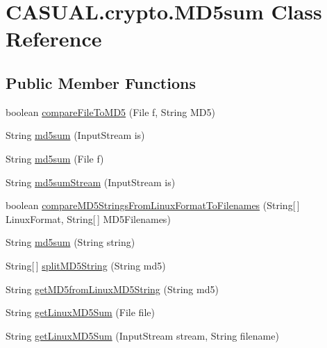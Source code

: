 \hypertarget{class_c_a_s_u_a_l_1_1crypto_1_1_m_d5sum}{\section{C\-A\-S\-U\-A\-L.\-crypto.\-M\-D5sum Class Reference}
\label{class_c_a_s_u_a_l_1_1crypto_1_1_m_d5sum}
}
\subsection*{Public Member Functions}
\begin{DoxyCompactItemize}
\item 
boolean \hyperlink{class_c_a_s_u_a_l_1_1crypto_1_1_m_d5sum_a0179d638f6ae800b156ca5919e07abd9}{compare\-File\-To\-M\-D5} (File f, String M\-D5)
\item 
String \hyperlink{class_c_a_s_u_a_l_1_1crypto_1_1_m_d5sum_ab4d622e3672fd560e125788e8c11da65}{md5sum} (Input\-Stream is)
\item 
String \hyperlink{class_c_a_s_u_a_l_1_1crypto_1_1_m_d5sum_aba2245d66d6ca47b7bce88b31fec319d}{md5sum} (File f)
\item 
String \hyperlink{class_c_a_s_u_a_l_1_1crypto_1_1_m_d5sum_ab3881ae275c9c2e89d3bbe0c20267f90}{md5sum\-Stream} (Input\-Stream is)
\item 
boolean \hyperlink{class_c_a_s_u_a_l_1_1crypto_1_1_m_d5sum_a891774e4ad9bd42758f268cff8b99c1a}{compare\-M\-D5\-Strings\-From\-Linux\-Format\-To\-Filenames} (String\mbox{[}$\,$\mbox{]} Linux\-Format, String\mbox{[}$\,$\mbox{]} M\-D5\-Filenames)
\item 
String \hyperlink{class_c_a_s_u_a_l_1_1crypto_1_1_m_d5sum_a03e30cfb69b9e4edce983b18db357103}{md5sum} (String string)
\item 
String\mbox{[}$\,$\mbox{]} \hyperlink{class_c_a_s_u_a_l_1_1crypto_1_1_m_d5sum_a3ade14378f1ab5473e8cc4f9586a5b20}{split\-M\-D5\-String} (String md5)
\item 
String \hyperlink{class_c_a_s_u_a_l_1_1crypto_1_1_m_d5sum_a6c175a3bfcc8ff9d9ccfdfe5570c6748}{get\-M\-D5from\-Linux\-M\-D5\-String} (String md5)
\item 
String \hyperlink{class_c_a_s_u_a_l_1_1crypto_1_1_m_d5sum_ab47b5cec8ec08d6aef4fc80305644ea3}{get\-Linux\-M\-D5\-Sum} (File file)
\item 
String \hyperlink{class_c_a_s_u_a_l_1_1crypto_1_1_m_d5sum_a99840f961574366d47cad9e5415cba0a}{get\-Linux\-M\-D5\-Sum} (Input\-Stream stream, String filename)
\item 

\end{DoxyCompactItemize}

